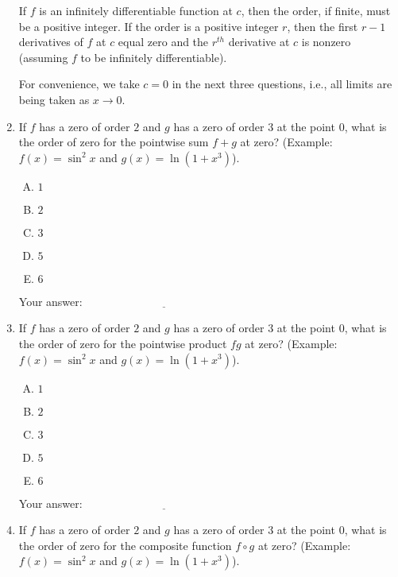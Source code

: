 \documentclass[10pt]{amsart}
\begin{document}
\begin{enumerate}
  If $f$ is an infinitely differentiable function at $c$, then the
  order, if finite, must be a positive integer. If the order is a
  positive integer $r$, then the first $r - 1$ derivatives of $f$ at
  $c$ equal zero and the $r^{th}$ derivative at $c$ is nonzero
  (assuming $f$ to be infinitely differentiable).

  For convenience, we take $c = 0$ in the next three questions, i.e.,
  all limits are being taken as $x \to 0$.

\item If $f$ has a zero of order $2$ and $g$ has a zero of order $3$
  at the point $0$, what is the order of zero for the pointwise sum $f
  + g$ at zero?  (Example: $f(x) = \sin^2x$ and $g(x) = \ln(1 +
  x^3)$).

  \begin{enumerate}[(A)]
  \item $1$
  \item $2$
  \item $3$
  \item $5$
  \item $6$
  \end{enumerate}

  \vspace{0.1in}
  Your answer: $\underline{\qquad\qquad\qquad\qquad\qquad\qquad\qquad}$
  \vspace{0.15in}

\item If $f$ has a zero of order $2$ and $g$ has a zero of order $3$
  at the point $0$, what is the order of zero for the pointwise
  product $fg$ at zero?  (Example: $f(x) = \sin^2x$ and $g(x) = \ln(1
  + x^3)$).

  \begin{enumerate}[(A)]
  \item $1$
  \item $2$
  \item $3$
  \item $5$
  \item $6$
  \end{enumerate}

  \vspace{0.1in}
  Your answer: $\underline{\qquad\qquad\qquad\qquad\qquad\qquad\qquad}$
  \vspace{0.15in}

\item If $f$ has a zero of order $2$ and $g$ has a zero of order $3$
  at the point $0$, what is the order of zero for the composite
  function $f \circ g$ at zero?  (Example: $f(x) = \sin^2x$ and $g(x) =
  \ln(1 + x^3)$).


\end{enumerate}
\end{document}
